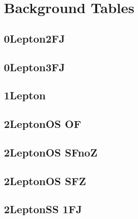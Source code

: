 \documentclass[landscape, 12pt,letterpaper]{article}
\begin{document}
\section{Background Tables}

\subsection{0Lepton2FJ }


\newpage

\subsection{0Lepton3FJ }


\newpage

\subsection{1Lepton }


\newpage

\subsection{2LeptonOS OF}


\newpage

\subsection{2LeptonOS SFnoZ}


\newpage

\subsection{2LeptonOS SFZ}


\newpage

\subsection{2LeptonSS 1FJ}


\newpage
\end{document}
